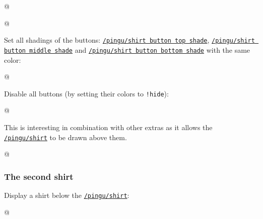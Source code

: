 \documentclass[parskip=half,english,numbers=noenddot,footnotes=nomultiple,oneside]{scrartcl}
\def\lpingu#1{\lstinline[style=lstpingu,language=pingulang]'#1'}
\newcommand*\keyref[2][/pingu/]{\hyperref[pk:#1#2]{\lpingu{#1#2}}}
\begin{document}
{\def\pingu@color@shirt@button@middle{<shirt-button-middle>}\def\pingu@color@shirt{<shirt-color>}
\begin{tcblisting}{@}
\begin{tikzpicture}
	\pingu[shirt, shirt button middle shade=green]
\end{tikzpicture}
\end{tcblisting}
\endsubkeyexplain}

{\def\pingu@color@shirt@button@top{<shirt-button-top>}\def\pingu@color@shirt{<shirt-color>}
\begin{tcblisting}{@}
\begin{tikzpicture}
	\pingu[shirt, shirt button bottom shade=green]
\end{tikzpicture}
\end{tcblisting}
\endsubkeyexplain}

Set all shadings of the buttons: \keyref{shirt button top shade}, \keyref{shirt button middle shade} and \keyref{shirt button bottom shade} with the same color:
\begin{tcblisting}{@}
\begin{tikzpicture}
	\pingu[shirt, shirt buttons shade=green]
\end{tikzpicture}
\end{tcblisting}
\endsubkeyexplain

Disable all buttons (by setting their colors to \lpingu{!hide}):
\begin{tcblisting}{@}
\end{tcblisting}
\endsubkeyexplain

This is interesting in combination with other extras as it allows the \keyref{shirt} to be drawn above them.
\begin{tcblisting}{@}
\end{tcblisting}
\endsubkeyexplain

\subsubsection{The second shirt}
	Display a shirt below the \keyref{shirt}:
\begin{tcblisting}{@}
\begin{tikzpicture}
	\pingu[second shirt=green, shirt]
\end{tikzpicture}
\end{tcblisting}
\endkeyexplain
\end{document}
